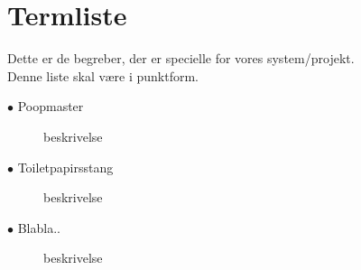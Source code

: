 \chapter{Termliste}\label{ch:Termliste}
Dette er de begreber, der er specielle for vores system/projekt.\\ Denne liste skal være i punktform.

\begin{description}
	\item[$\bullet$ Poopmaster] beskrivelse
	\item[$\bullet$ Toiletpapirsstang] beskrivelse
	\item[$\bullet$ Blabla..] beskrivelse
\end{description}